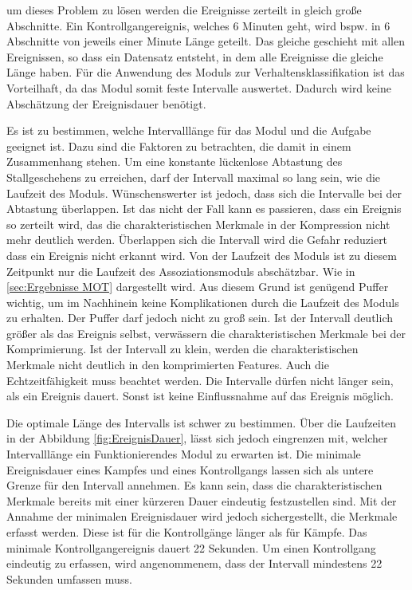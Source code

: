 um dieses Problem zu lösen werden die Ereignisse zerteilt in gleich große Abschnitte. Ein Kontrollgangereignis, welches 6 Minuten geht, wird bspw. in 6 Abschnitte von jeweils einer Minute Länge geteilt. Das gleiche geschieht mit allen Ereignissen, so dass ein Datensatz entsteht, in dem alle Ereignisse die gleiche Länge haben. Für die Anwendung des Moduls zur Verhaltensklassifikation ist das Vorteilhaft, da das Modul somit feste Intervalle auswertet. Dadurch wird keine Abschätzung der Ereignisdauer benötigt. \par

Es ist zu bestimmen, welche Intervalllänge für das Modul und die Aufgabe geeignet ist. Dazu sind die Faktoren zu betrachten, die damit in einem Zusammenhang stehen. Um eine konstante lückenlose Abtastung des Stallgeschehens zu erreichen, darf der Intervall maximal so lang sein, wie die Laufzeit des Moduls. Wünschenswerter ist jedoch, dass sich die Intervalle bei der Abtastung überlappen. Ist das nicht der Fall kann es passieren, dass ein Ereignis so zerteilt wird, das die charakteristischen Merkmale in der Kompression nicht mehr deutlich werden. Überlappen sich die Intervall wird die Gefahr reduziert dass ein Ereignis nicht erkannt wird. Von der Laufzeit des Moduls ist zu diesem Zeitpunkt nur die Laufzeit des Assoziationsmoduls abschätzbar. Wie in \autoref{sec:Ergebnisse MOT} dargestellt wird. Aus diesem Grund ist genügend Puffer wichtig, um im Nachhinein keine Komplikationen durch die Laufzeit des Moduls zu erhalten. Der Puffer darf jedoch nicht zu groß sein. Ist der Intervall deutlich größer als das Ereignis selbst, verwässern die charakteristischen Merkmale bei der Komprimierung. Ist der Intervall zu klein, werden die charakteristischen Merkmale nicht deutlich in den komprimierten Features. Auch die Echtzeitfähigkeit muss beachtet werden. Die Intervalle dürfen nicht länger sein, als ein Ereignis dauert. Sonst ist keine Einflussnahme auf das Ereignis möglich.\par

Die optimale Länge des Intervalls ist schwer zu bestimmen. Über die Laufzeiten in der Abbildung \ref{fig:EreignisDauer}, lässt sich jedoch eingrenzen mit, welcher Intervalllänge ein Funktionierendes Modul zu erwarten ist. Die minimale Ereignisdauer eines Kampfes und eines Kontrollgangs lassen sich als untere Grenze für den Intervall annehmen. Es kann sein, dass die charakteristischen Merkmale bereits mit einer kürzeren Dauer eindeutig festzustellen sind. Mit der Annahme der minimalen Ereignisdauer wird jedoch sichergestellt, die Merkmale erfasst werden. Diese ist für die Kontrollgänge länger als für Kämpfe. Das minimale Kontrollgangereignis dauert 22 Sekunden. Um einen Kontrollgang eindeutig zu erfassen, wird angenommenem, dass der Intervall mindestens 22 Sekunden umfassen muss. \par

